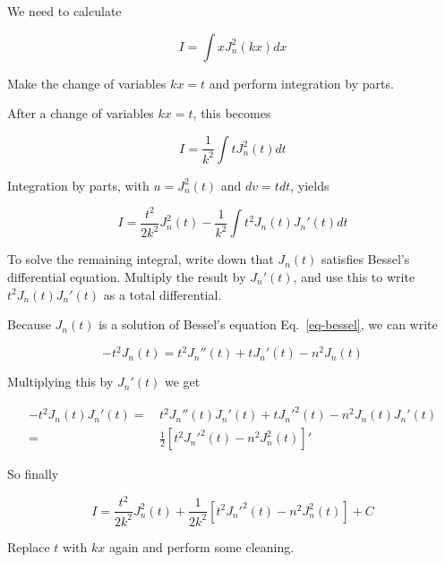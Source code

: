 We need to calculate

\begin{equation}
I = \int x J_n^2(k x) dx
\end{equation}

\begin{cue}
Make the change of variables $kx = t$ and perform integration by parts.
\end{cue}

After a change of variables $kx = t$, this becomes

\begin{equation}
I = \frac{1}{k^2} \int t J_n^2(t) dt
\end{equation}

Integration by parts, with $u=J_n^2(t)$ and $dv=t dt$, yields

\begin{equation}
I = \frac{t^2}{2 k^2}J_n^2(t) - \frac{1}{k^2} \int t^2 J_n(t) J_n'(t) dt
\end{equation}

\begin{cue}
  To solve the remaining integral, write down that $J_n(t)$ satisfies Bessel's differential equation. Multiply the result by $J_n'(t)$, and use this to write $t^2 J_n(t) J_n'(t)$ as a total differential. 
\end{cue}

Because $J_n(t)$ is a solution of Bessel's equation Eq.~\ref{eq-bessel}, we can write

\begin{equation} 
- t^2 J_n(t) = t^2 J_n''(t) + t J_n'(t) - n^2 J_n(t)
\end{equation}

Multiplying this by $J_n'(t)$ we get

\begin{align} 
- t^2 J_n(t) J_n'(t) = &\, t^2 J_n''(t)J_n'(t) + t J_n'^2(t) - n^2 J_n(t)J_n'(t) \nonumber \\
 = &\, \frac{1}{2} \left[{t^2 J_n'^2(t) - n^2 J_n^2(t)}\right]'
\end{align}

So finally

\begin{equation}
I = \frac{t^2}{2 k^2}J_n^2(t) + \frac{1}{2 k^2} \left[{t^2 J_n'^2(t) - n^2 J_n^2(t)}\right] + C
\end{equation} 

\begin{cue}
Replace $t$ with $kx$ again and perform some cleaning.
\end{cue}

